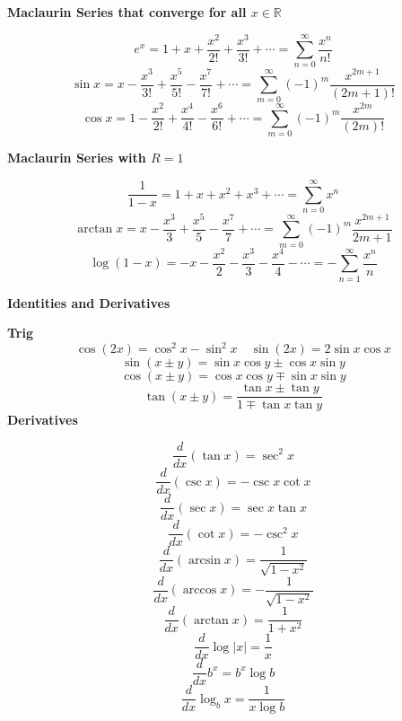 \documentclass[10pt]{article}
\newcommand{\R}{{\mathbb R}}
\newcommand\sectionheading[1]{\begin{center}\large{\textbf{#1}}\end{center}\normalsize}
\newcommand\heading[1]{\smallskip\textbf{#1}\smallskip}
\begin{document}
\begin{multicols*}{3}
\heading{Maclaurin Series that converge for all $x\in\R$}

\[e^x=1+x+\frac{x^2}{2!}+\frac{x^3}{3!}+\cdots=\sum_{n=0}^\infty \frac{x^n}{n!}\]
\[\sin x=x-\frac{x^3}{3!}+\frac{x^5}{5!}-\frac{x^7}{7!}+\cdots=\sum_{m=0}^{\infty}(-1)^m \frac{x^{2m+1}}{(2m+1)!}\]
\[\cos x=1-\frac{x^2}{2!}+\frac{x^4}{4!}-\frac{x^6}{6!}+\cdots=\sum_{m=0}^{\infty}(-1)^m \frac{x^{2m}}{(2m)!}\]

\heading{Maclaurin Series with $R=1$}

\[\frac{1}{1-x}=1+x+x^2+x^3+\cdots=\sum_{n=0}^\infty x^n\]
\[\arctan x=x-\frac{x^3}{3}+\frac{x^5}{5}-\frac{x^7}{7}+\cdots=\sum_{m=0}^{\infty}(-1)^m \frac{x^{2m+1}}{2m+1}\]
\[\log(1-x)=-x-\frac{x^2}{2}-\frac{x^3}{3}-\frac{x^4}{4}-\cdots=-\sum_{n=1}^{\infty}\frac{x^n}{n}\]

\sectionheading{Identities and Derivatives}
\heading{Trig}
\[\cos(2x)=\cos^2 x-\sin^2 x \quad \sin(2x)=2\sin x\cos x\]
\[\sin(x\pm y)=\sin x \cos y \pm \cos x \sin y\]
\[\cos(x\pm y)=\cos x \cos y \mp \sin x \sin y\]
\[\tan(x\pm y)=\frac{\tan x \pm \tan y}{1 \mp \tan x \tan y}\]
\heading{Derivatives} 
\begin{multicols*}{2}
\[\frac{d}{dx} (\tan x)=\sec^2 x\]
\[\frac{d}{dx} (\csc x)=-\csc x \cot x\]
\[\frac{d}{dx} (\sec x)=\sec x \tan x\]
\[\frac{d}{dx} (\cot x)=-\csc^2 x\]
\[\frac{d}{dx} (\arcsin x)=\frac{1}{\sqrt{1-x^2}}\]
\[\frac{d}{dx} (\arccos x)=-\frac{1}{\sqrt{1-x^2}}\]
\[\frac{d}{dx} (\arctan x)=\frac{1}{1+x^2}\]
\[\frac{d}{dx} \log |x| = \frac{1}{x}\]
\[\frac{d}{dx} b^x = b^x \log b\]
\[\frac{d}{dx} \log_b x=\frac{1}{x\log b}\]
\end{multicols*}

\end{multicols*}
\end{document}
